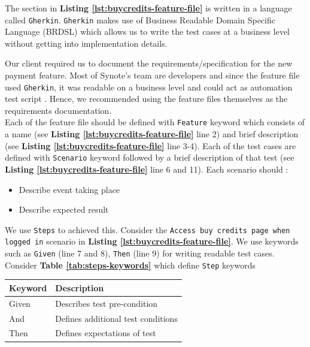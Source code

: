 The section in \textbf{Listing \ref{lst:buycredits-feature-file}} is written in a language called \texttt{Gherkin}. \texttt{Gherkin} makes use of Business Readable Domain Specific Language (BRDSL) which allows us to write the test cases at a business level without getting into implementation details.

Our client required us to document the requirements/specification for the new payment feature. Most of Synote's team are developers and since the feature file used \texttt{Gherkin}, it was readable on a business level and could act as automation test script \cite{featurefile1}. Hence, we recommended using the feature files themselves as the requirements documentation.\\

Each of the feature file should be defined with \texttt{Feature} keyword which consists of a name  (see \textbf{Listing \ref{lst:buycredits-feature-file}} line  2) and brief description  (see \textbf{Listing \ref{lst:buycredits-feature-file}} line  3-4). Each of the test cases are defined with \texttt{Scenario} keyword followed by a brief description of that test (see \textbf{Listing \ref{lst:buycredits-feature-file}} line  6 and 11). Each scenario should \cite{featurefile3}:
\begin{itemize}
\item Describe event taking place
\item Describe expected result
\end{itemize}

We use \texttt{Steps} to achieved this. Consider the \texttt{Access buy credits page when logged in} scenario in \textbf{Listing \ref{lst:buycredits-feature-file}}. We use keywords such as \texttt{Given} (line 7 and 8), \texttt{Then} (line 9) for writing readable test cases. Consider \textbf{Table \ref{tab:steps-keywords}} which define \texttt{Step} keywords \cite{featurefile1}

\begin{center}
\begin{tabular}{ |p{2cm}|p{7cm}| }

 \hline
 	Keyword &
 	Description\\
 \hline
 	Given & Describes test pre-condition\\
 \hline
 	And & Defines additional test conditions\\
 \hline
 	Then & Defines expectations of test \\
 \hline

\end{tabular}
\label{tab:steps-keywords}
\end{center}

